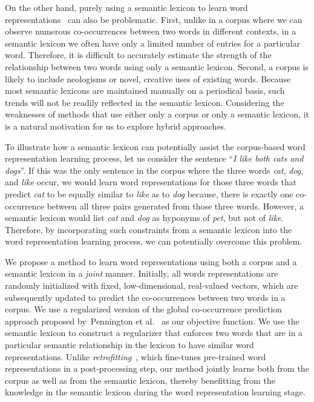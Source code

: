 \documentclass[letterpaper]{article}
\begin{document}
On the other hand, purely using a semantic lexicon to learn word representations~\cite{Bollegala:AAAI:2015} can also be problematic.
First, unlike in a corpus where we can observe numerous co-occurrences between two words in different contexts,
in a semantic lexicon we often have only a limited number of entries for a  particular word. 
Therefore, it is difficult to accurately estimate the strength of the relationship between two words using only a semantic lexicon. 
Second, a corpus is likely to include neologisms or novel, creative uses of existing words. 
Because most semantic lexicons are maintained manually on a periodical basis, such trends will not be readily reflected in the semantic lexicon.
Considering the weaknesses of methods that use either only a corpus or only a semantic lexicon, it is a natural motivation for us to
explore hybrid approaches.

To illustrate how a semantic lexicon can potentially assist the corpus-based word representation learning process,
let us consider the sentence ``\emph{I like both cats and dogs}''. 
If this was the only sentence in the corpus where the three words \emph{cat}, \emph{dog}, and \emph{like} occur, 
we would learn word representations for those three words 
that predict \emph{cat} to be equally similar to \emph{like} as to \emph{dog} because,
there is exactly one co-occurrence between all three pairs generated from those three words.
However, a semantic lexicon would list \emph{cat} and \emph{dog} as hyponyms of \emph{pet}, but not of \emph{like}.
Therefore, by incorporating such constraints from a semantic lexicon
 into the word representation learning process, we can potentially overcome this problem.
 
We propose a method to learn word representations using both a corpus and a semantic lexicon in a \emph{joint} manner.
Initially, all words representations are randomly initialized with fixed, low-dimensional, real-valued vectors, which are subsequently updated to
predict the co-occurrences between two words in a corpus. 
We use a regularized version of the global co-occurrence prediction approach proposed
by~Pennington et al.~ as our objective function.
We use the semantic lexicon to construct a regularizer that enforces two words that are in a particular semantic relationship in the lexicon 
to have similar word representations.
Unlike \emph{retrofitting}~\cite{faruqui-EtAl:2015:NAACL-HLT}, 
which fine-tunes pre-trained word representations in a post-processing step, our method
jointly learns both from the corpus as well as from the semantic lexicon, thereby benefitting from the knowledge in the 
semantic lexicon during the word representation learning stage.
\end{document}
